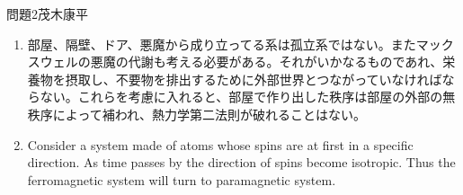\documentclass[fleqn]{jbook}
\begin{document}
\begin{answer}{問題2}{茂木康平}
\begin{enumerate}
    \item 部屋、隔壁、ドア、悪魔から成り立ってる系は孤立系ではない。またマックスウェルの悪魔の代謝も考える必要がある。それがいかなるものであれ、栄養物を摂取し、不要物を排出するために外部世界とつながっていなければならない。これらを考慮に入れると、部屋で作り出した秩序は部屋の外部の無秩序によって補われ、熱力学第二法則が破れることはない。

    \item Consider a system made of atoms whose spins are at first in a specific direction. As time passes by the direction of spins become isotropic. Thus the ferromagnetic system will turn to paramagnetic system.

\end{enumerate}

\end{answer}
\end{document}
